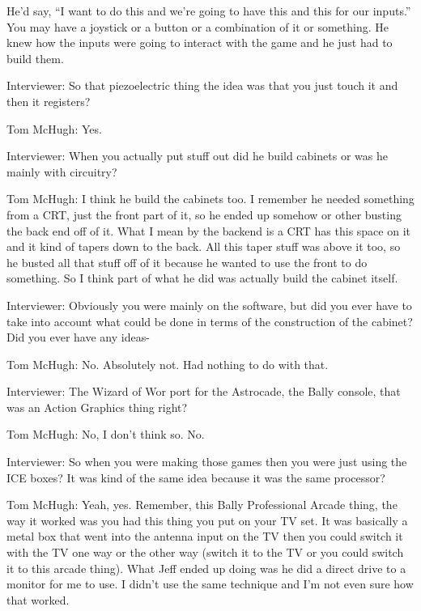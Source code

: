 He’d say, “I want to do this and we’re going to have this and this for our inputs.” You may have a joystick or a button or a combination of it or something. He knew how the inputs were going to interact with the game and he just had to build them.

\textcolor{interviewer}{Interviewer:} So that piezoelectric thing the idea was that you just touch it and then it registers?

\textcolor{interviewee}{Tom McHugh:} Yes.

\textcolor{interviewer}{Interviewer:} When you actually put stuff out did he build cabinets or was he mainly with circuitry?

\textcolor{interviewee}{Tom McHugh:} I think he build the cabinets too. I remember he needed something from a CRT, just the front part of it, so he ended up somehow or other busting the back end off of it. What I mean by the backend is a CRT has this space on it and it kind of tapers down to the back. All this taper stuff was above it too, so he busted all that stuff off of it because he wanted to use the front to do something. So I think part of what he did was actually build the cabinet itself.

\textcolor{interviewer}{Interviewer:} Obviously you were mainly on the software, but did you ever have to take into account what could be done in terms of the construction of the cabinet? Did you ever have any ideas-

\textcolor{interviewee}{Tom McHugh:} No. Absolutely not. Had nothing to do with that.

\textcolor{interviewer}{Interviewer:} The Wizard of Wor port for the Astrocade, the Bally console, that was an Action Graphics thing right?

\textcolor{interviewee}{Tom McHugh:} No, I don’t think so. No.

\textcolor{interviewer}{Interviewer:} So when you were making those games then you were just using the ICE boxes? It was kind of the same idea because it was the same processor?

\textcolor{interviewee}{Tom McHugh:} Yeah, yes. Remember, this Bally Professional Arcade thing, the way it worked was you had this thing you put on your TV set. It was basically a metal box that went into the antenna input on the TV then you could switch it with the TV one way or the other way (switch it to the TV or you could switch it to this arcade thing). What Jeff ended up doing was he did a direct drive to a monitor for me to use. I didn’t use the same technique and I’m not even sure how that worked.

